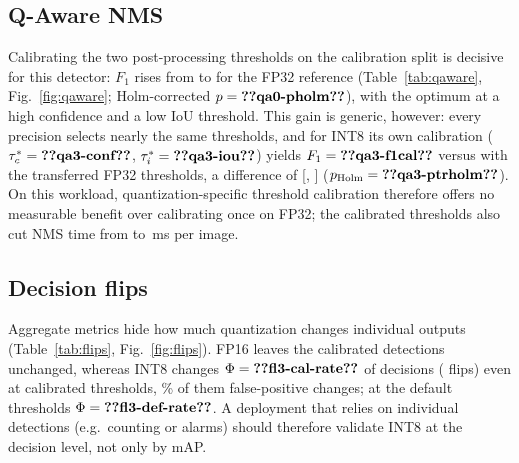 \documentclass[conference]{IEEEtran}
\begin{document}
\subsection{Q-Aware NMS}
\begin{table}[t]
\caption{Test-split micro-$F_1$ at the default thresholds (0.25, 0.45), with the thresholds calibrated on the FP32
reference (FP32-thr.), and with each configuration's own calibration; the precision-specific effect is own vs FP32-thr.
(paired bootstrap CI; Wilcoxon on per-image errors, Holm-corrected).}
\label{tab:qaware}
\centering
\resizebox{\columnwidth}{!}{}
\end{table}
Calibrating the two post-processing thresholds on the calibration split is decisive for this detector: $F_1$ rises from
 to  for the FP32 reference (Table~\ref{tab:qaware}, Fig.~\ref{fig:qaware}; Holm-corrected
$p = \res{qa0-pholm}$), with the optimum at a high confidence and a low IoU threshold. This gain is generic, however: every
precision selects nearly the same thresholds, and for INT8 its own calibration ($\tau_c^* = \res{qa3-conf}$,
$\tau_i^* = \res{qa3-iou}$) yields $F_1 = \res{qa3-f1cal}$ versus  with the transferred FP32 thresholds,
a difference of  [, ] ($p_{\text{Holm}} = \res{qa3-ptrholm}$). On this
workload, quantization-specific threshold calibration therefore offers no measurable benefit over calibrating once on
FP32; the calibrated thresholds also cut NMS time from  to \,ms per image.

\subsection{Decision flips}
\begin{table}[t]
\caption{Detection-level flips against PyTorch FP32 (test split).}
\label{tab:flips}
\centering
\resizebox{\columnwidth}{!}{}
\end{table}
Aggregate metrics hide how much quantization changes individual outputs (Table~\ref{tab:flips},
Fig.~\ref{fig:flips}). FP16 leaves the calibrated detections unchanged, whereas INT8 changes $\Phi = \res{fl3-cal-rate}$ of
decisions ( flips) even at calibrated thresholds, \% of them false-positive
changes; at the default thresholds $\Phi = \res{fl3-def-rate}$. A deployment that relies on individual detections
(e.g.\ counting or alarms) should therefore validate INT8 at the decision level, not only by mAP.
\end{document}

